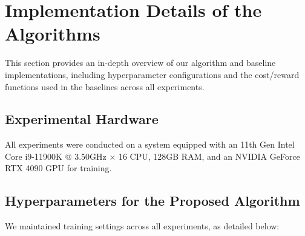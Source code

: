 \section{Implementation Details of the Algorithms}

This section provides an in-depth overview of our algorithm and baseline implementations, including hyperparameter configurations and the cost/reward functions used in the baselines across all experiments.

\subsection{Experimental Hardware}
All experiments were conducted on a system equipped with an 11th Gen Intel Core i9-11900K @ 3.50GHz × 16 CPU, 128GB RAM, and an NVIDIA GeForce RTX 4090 GPU for training.
\vspace{-1em}
\subsection{Hyperparameters for the Proposed Algorithm}
We maintained training settings across all experiments, as detailed below:

